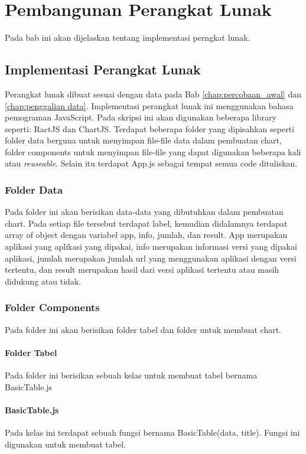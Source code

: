 \chapter{Pembangunan Perangkat Lunak}
\label{chap:pembangunan PL}
Pada bab ini akan dijelaskan tentang implementasi perngkat lunak.
\section{Implementasi Perangkat Lunak}
Perangkat lunak dibuat sesuai dengan data pada Bab \ref{chap:percobaan_awal} dan \ref{chap:penggalian data}. Implementasi perangkat lunak ini menggunakan bahasa pemograman JavaScript. Pada skripsi ini akan digunakan beberapa library seperti: RactJS dan ChartJS. Terdapat beberapa folder yang dipisahkan seperti folder data berguna untuk menyimpan file-file data dalam pembuatan chart, folder components untuk menyimpan file-file yang dapat digunakan beberapa kali atau \textit{reuseable}. Selain itu terdapat App.js sebagai tempat semua code dituliskan.

\subsection{Folder Data}
Pada folder ini akan berisikan data-data yang dibutuhkan dalam pembuatan chart. Pada setiap file  tersebut terdapat label, kemudian didalamnya terdapat array of object dengan variabel app, info, jumlah, dan result. App merupakan aplikasi yang aplikasi yang dipakai, info merupakan informasi versi yang dipakai aplikasi, jumlah merupakan jumlah url yang menggunakan aplikasi dengan versi tertentu, dan result merupakan hasil dari versi aplikasi tertentu atau masih didukung atau tidak.

\subsection{Folder Components}
Pada folder ini akan berisikan folder tabel dan folder untuk membuat chart. 
\subsubsection{Folder Tabel}
Pada folder ini berisikan sebuah kelas untuk membuat tabel bernama BasicTable.js
\subsubsection{BasicTable.js}
Pada kelas ini terdapat sebuah fungsi bernama BasicTable({data, title}). Fungsi ini digunakan untuk membuat tabel.




